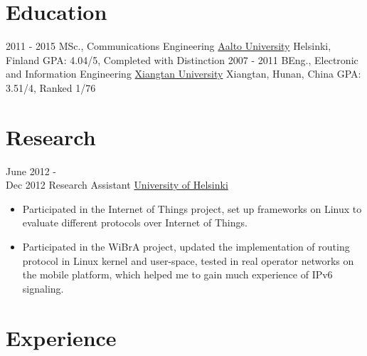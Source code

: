 \documentclass[letterpaper]{twentysecondcv} %
\begin{document}
\makeprofile %

\section{Education}

\begin{twenty} %
	\twentyitem
    	{2011 - 2015}
        {MSc., Communications Engineering}
        {\href{http://www.aalto.fi/en/}{Aalto University}}
        {Helsinki, Finland}
        {GPA: 4.04/5, Completed with Distinction}
	\twentyitem
    	{2007 - 2011}
        {BEng.,  Electronic and Information Engineering}
        {\href{http://www.xtu.edu.cn/english/}{Xiangtan University}}
        {Xiangtan, Hunan, China}
        {GPA: 3.51/4, Ranked 1/76}
\end{twenty}


\section{Research}
\begin{twenty}
	\twentyitem
    	{June 2012 - \\Dec 2012}
        {Research Assistant}
        {\href{https://www.helsinki.fi/en}{University of Helsinki}}
        {}
        {
        {\begin{itemize}
        \item Participated in the Internet of Things project, set up	 frameworks on Linux to evaluate different protocols over Internet of Things.
        \item Participated in the WiBrA project,	 updated	 the	 implementation of routing protocol in Linux kernel and	 user-space, tested in real operator networks on the mobile platform, which helped me to gain much experience of IPv6 signaling.
    \end{itemize}}
        }
\end{twenty}


\section{Experience}
\end{document}
